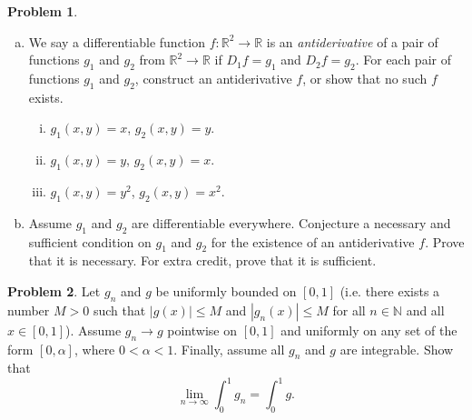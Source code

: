 \documentclass{amsart}
\newcommand{\+}[1]{\ensuremath{\mathbf{#1}}}
\newcommand{\R}{{\mathbb R}}
\theoremstyle{definition}
\newtheorem{prob}{Problem}
\begin{document}
\vspace{3mm}




\begin{prob}
\begin{enumerate}[(a)]
 \item 
 We say a differentiable function $f: \R^2 \to \R$
 is an \emph{antiderivative} of a pair of
 functions $g_1$ and $g_2$
 from $\R^2 \to \R$
 if  $D_1 f = g_1$ and $D_2 f = g_2$.
  For each pair of functions $g_1$ and $g_2$,
 construct an antiderivative $f$,
 or show that no such $f$ exists.
 \begin{enumerate}[(i)]
  \item $g_1(x,y) = x$, $g_2(x,y) = y$.
  \item $g_1(x,y) = y$, $g_2(x,y)=x$.
  \item $g_1(x,y) = y^2$, $g_2(x,y) = x^2$.
 \end{enumerate}
 \item
 Assume $g_1$ and $g_2$ are differentiable everywhere.
 Conjecture a necessary and sufficient condition
 on $g_1$ and $g_2$ for the 
 existence of an antiderivative $f$.
 Prove that it is necessary.
 For extra credit, prove that it is sufficient.
 \end{enumerate}
 \end{prob}

 \vspace{3mm}

\begin{prob}
 Let $g_n$ and $g$ be uniformly bounded on $[0,1]$ (i.e. there exists
 a number $M >0$ such that $|g(x)| \leq M$ and $|g_n(x)| \leq M$
 for all $n \in \mathbb{N}$ and all $x \in [0,1]$).
 Assume $g_n \to g$ pointwise on $[0,1]$ and uniformly
 on any set of the form $[0,\alpha]$, where $0 < \alpha < 1$.
 Finally, assume all $g_n$ and $g$ are integrable.
 Show that 
 \[\lim_{n \to \infty} \int^1_0 g_n = \int^1_0 g.
 \]
\end{prob}
\end{document}
